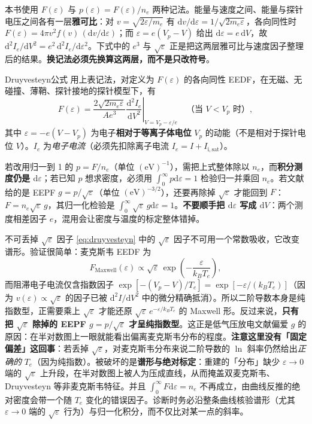 \documentclass[12pt,a4paper,openany,oneside]{book}
\newcommand{\diff}{\mathrm{d}}
\newcommand{\eps}{\varepsilon}
\begin{document}
本书使用 $F(\eps)$ 与 $p(\eps)=F(\eps)/n_e$ 两种记法。能量与速度之间、能量与探针电压之间各有一层\textbf{雅可比}：对 $v=\sqrt{2\eps/m_e}$ 有 $\diff v/\diff\eps=1/\sqrt{2m_e\eps}$，各向同性时 $F(\eps)=4\pi v^2f(v)\,(\diff v/\diff\eps)$；而 $\eps=e(V_p-V)$ 给出 $\diff\eps=e\,\diff V$，故 $\diff^2I_e/\diff V^2=e^2\,\diff^2I_e/\diff\eps^2$。下式中的 $e^3$ 与 $\sqrt{\eps}$ 正是把这两层雅可比与速度因子整理后的结果。\textbf{换记法必须先换算这两层，而不是只改符号}。

\begin{theorem}{Druyvesteyn公式}{}{}
用上表记法，对定义为 $F(\eps)$ 的各向同性 EEDF，在无磁、无碰撞、薄鞘、探针接地的探针模型下，有
\begin{equation}
F(\eps) = \frac{2\sqrt{2 m_e \eps}}{A e^3}
\left.\frac{\diff^2 I_e}{\diff V^2}\right|_{V = V_p - \eps/e}
\quad \text{（当 } V < V_p \text{ 时）},
\label{eq:druyvesteyn}
\end{equation}
其中 $\eps = -e(V - V_p)$ 为电子\textbf{相对于等离子体电位} $V_p$ 的动能（不是相对于探针电位 $V$）。$I_e$ 为\emph{电子电流}（必须先扣除离子电流 $I_e = I + I_{\mathrm{i,sat}}$）。

若改用归一到 1 的 $p=F/n_e$（单位 $\mathrm{(eV)^{-1}}$），需把上式整体除以 $n_e$，而\textbf{积分测度仍是 $\diff\eps$}；若已知 $p$ 想求密度，必须用 $\int_0^\infty p\diff\eps=1$ 检验归一并乘回 $n_e$。若文献给的是 EEPF $g=p/\sqrt{\eps}$（单位 $\mathrm{(eV)^{-3/2}}$），还要再除掉 $\sqrt{\eps}$ 才能回到 $F$：$F=n_e\sqrt{\eps}\,g$，其归一化检验是 $\int_0^\infty\sqrt{\eps}\,g\diff\eps=1$。\textbf{不要顺手把 $\diff\eps$ 写成 $\diff V$}：两个测度相差因子 $e$，混用会让密度与温度的标定整体错掉。
\end{theorem}

\begin{warning}{不可丢掉 $\sqrt{\eps}$ 因子}{}
\eqref{eq:druyvesteyn} 中的 $\sqrt{\eps}$ 因子不可用一个常数吸收，它改变谱形。验证很简单：麦克斯韦 EEDF 为
\[
F_{\mathrm{Maxwell}}(\eps) \propto \sqrt{\eps}\,\exp\!\left(-\frac{\eps}{k_BT_e}\right),
\]
而阻滞电子电流仅含指数因子 $\exp[-(V_p-V)/T_e] = \exp[-\eps/(k_BT_e)]$（因为 $v(\eps)\propto\sqrt{\eps}$ 的因子已被 $\diff^2 I/\diff V^2$ 中的微分精确抵消）。所以二阶导数本身是纯指数型，正需要乘上 $\sqrt{\eps}$ 才能还原 $\sqrt{\eps}\,e^{-\eps/k_BT_e}$ 的 Maxwell 形。反过来说，\textbf{只有把 $\sqrt{\eps}$ 除掉的 EEPF $g=p/\sqrt{\eps}$ 才呈纯指数型}。这正是低气压放电文献偏爱 $g$ 的原因：在半对数图上一眼就能看出偏离麦克斯韦分布的程度。\textbf{注意这里没有「固定偏差」这回事}：若丢掉 $\sqrt{\eps}$，对麦克斯韦分布来说二阶导数的 $\ln$ 斜率仍然给出\emph{正确的} $T_e$（因为纯指数）。被破坏的是\textbf{谱形与绝对标定}：重建的「分布」缺少 $\eps\to0$ 端的 $\sqrt{\eps}$ 上升段，在半对数图上被人为压成直线，从而掩盖双麦克斯韦、Druyvesteyn 等非麦克斯韦特征。并且 $\int_0^\infty F\diff\eps=n_e$ 不再成立，由曲线反推的绝对密度会带一个随 $T_e$ 变化的错误因子。诊断时务必沿整条曲线核验谱形（尤其 $\eps\to0$ 端的 $\sqrt{\eps}$ 行为）与归一化积分，而不仅比对某一点的斜率。
\end{warning}
\end{document}
